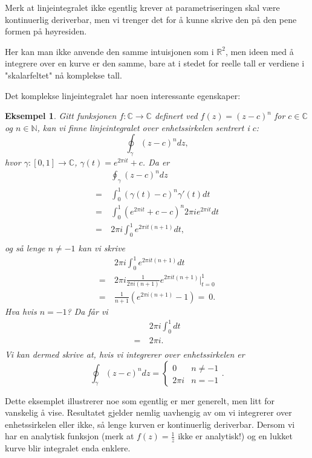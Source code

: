 \documentclass{article}
\newtheorem{example}{Eksempel}
\begin{document}
Merk at linjeintegralet ikke egentlig krever at parametriseringen skal være kontinuerlig deriverbar, men vi trenger det for å kunne skrive den på den pene formen på høyresiden.

Her kan man ikke anvende den samme intuisjonen som i $\mathbb{R}^2$, men ideen med å integrere over en kurve er den samme, bare at i stedet for reelle tall er verdiene i "skalarfeltet" nå komplekse tall.

Det komplekse linjeintegralet har noen interessante egenskaper:
\begin{example}
    Gitt funksjonen $f:\mathbb{C} \longrightarrow \mathbb{C}$ definert ved $f(z) = (z-c)^n$ for $c \in \mathbb{C}$ og $n \in \mathbb{N}$, kan vi finne linjeintegralet over  enhetssirkelen sentrert i $c$:
    \[\oint_\gamma(z-c)^n dz,\]
    hvor $\gamma:[0, 1] \longrightarrow \mathbb{C}$, $\gamma(t) = e^{2\pi it} + c$. Da er
    \begin{align}
        & \oint_\gamma(z-c)^n dz \\
        =\ & \int_0^1(\gamma(t) - c)^n\gamma'(t) dt \\
        =\ & \int_0^1(e^{2\pi it} + c - c)^n2\pi i e^{2\pi it} dt \\
        =\ & 2\pi i \int_0^1 e^{2\pi it(n + 1)}dt, \\
    \end{align}
    og så lenge $n \neq -1$ kan vi skrive 
    \begin{align}
        & 2\pi i \int_0^1 e^{2\pi it(n + 1)}dt \\
        =\ & 2\pi i \frac{1}{2\pi i(n+1)}e^{2\pi it(n + 1)} \bigg\rvert_{t=0}^1 \\
        =\ & \frac{1}{n + 1} (e^{2\pi i(n + 1)} - 1)
        =\ 0.
    \end{align}
    Hva hvis $n = -1$? Da får vi
        \begin{align}
        & 2\pi i \int_0^1 dt \\
        =\ & 2\pi i. \\
    \end{align}
    Vi kan dermed skrive at, hvis vi integrerer over enhetssirkelen er 
    \[
        \oint_\gamma(z-c)^n dz = \begin{cases}
            0 & n \neq -1 \\
            2 \pi i & n = -1
        \end{cases}.
    \]
\end{example}

Dette eksemplet illustrerer noe som egentlig er mer generelt, men litt for vanskelig å vise. Resultatet gjelder nemlig uavhengig av om vi integrerer over enhetssirkelen eller ikke, så lenge kurven er kontinuerlig deriverbar. 
Dersom vi har en analytisk funksjon (merk at $f(z) = \frac{1}{z}$ ikke er analytisk!) og en lukket kurve blir integralet enda enklere.
\end{document}

